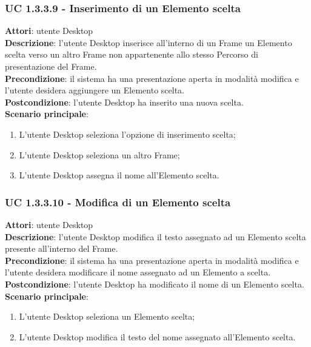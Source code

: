 \subsubsection{UC 1.3.3.9 - Inserimento di un Elemento scelta}{
	\label{uc1.3.3.9}
	\textbf{Attori}: utente Desktop \\
	\textbf{Descrizione}: l'utente Desktop inserisce all'interno di un Frame un Elemento scelta verso un altro Frame non appartenente allo stesso Percorso di presentazione del Frame. \\
	\textbf{Precondizione}: il sistema ha una presentazione aperta in modalità modifica e l'utente desidera aggiungere un Elemento scelta.	\\
	\textbf{Postcondizione}: l'utente Desktop ha inserito una nuova scelta.	\\
	\textbf{Scenario principale}:
	\begin{enumerate}
		\item L'utente Desktop seleziona l'opzione di inserimento scelta;
		\item L'utente Desktop seleziona un altro Frame;
		\item L'utente Desktop assegna il nome all'Elemento scelta.
	\end{enumerate}
	}
\subsubsection{UC 1.3.3.10 - Modifica di un Elemento scelta}{
	\label{uc1.3.3.10}
	\textbf{Attori}: utente Desktop \\
	\textbf{Descrizione}: l'utente Desktop modifica il testo assegnato ad un Elemento scelta presente all'interno del Frame. \\
	\textbf{Precondizione}: il sistema ha una presentazione aperta in modalità modifica e l'utente desidera modificare il nome assegnato ad un Elemento a scelta.	\\
	\textbf{Postcondizione}: l'utente Desktop ha modificato il nome di un Elemento scelta.	\\
	\textbf{Scenario principale}:
	\begin{enumerate}
		\item L'utente Desktop seleziona un Elemento scelta;
		\item L'utente Desktop modifica il testo del nome assegnato all'Elemento scelta.
	\end{enumerate}
	}
